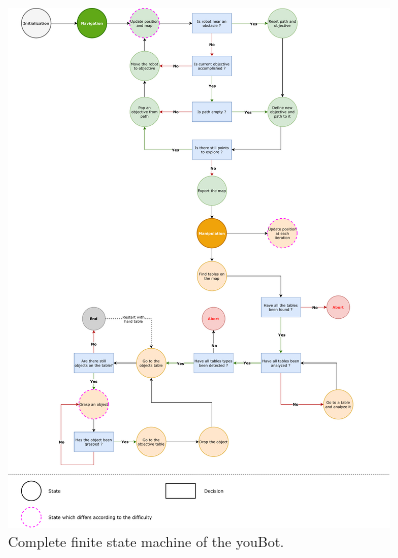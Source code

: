 \documentclass[a4paper, 10pt, conference]{ieeeconf}
\begin{document}
    
    
    
    \nocite{*}
    
    
    \newpage
    
    \begin{figure}
        \centering
        \includegraphics[width=0.9\textwidth]{resources/pdf/fsm.pdf}
        \caption{Complete finite state machine of the youBot.}
        \label{fig:fsm}
    \end{figure}
\end{document}
